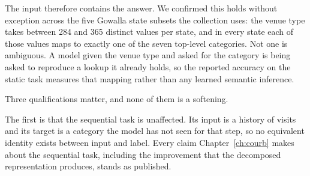 The input therefore contains the answer. We confirmed this holds without exception across the five
Gowalla state subsets the collection uses: the venue type takes between 284 and 365 distinct values
per state, and in every state each of those values maps to exactly one of the seven top-level
categories. Not one is ambiguous. A model given the venue type and asked for the category is being
asked to reproduce a lookup it already holds, so the reported accuracy on the static task measures
that mapping rather than any learned semantic inference.

Three qualifications matter, and none of them is a softening.

The first is that the sequential task is unaffected. Its input is a history of visits and
its target is a category the model has not seen for that step, so no equivalent identity
exists between input and label. Every claim Chapter~\ref{ch:courb} makes about the
sequential task, including the improvement that the decomposed representation produces,
stands as published.

